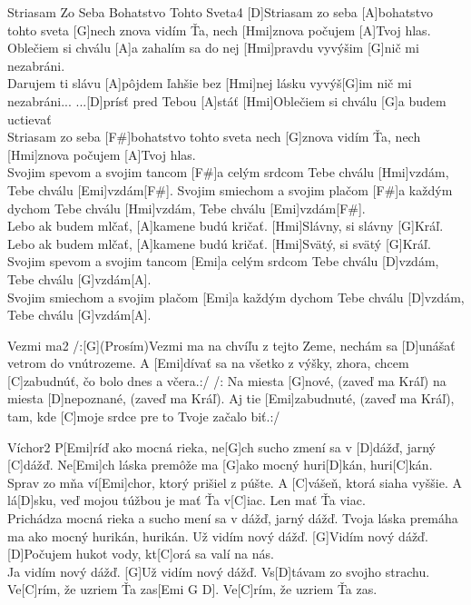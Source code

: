 \documentclass[12pt]{article}
\begin{document}
\begin{song}{Striasam Zo Seba Bohatstvo Tohto Sveta}{4}
	[D]Striasam zo seba
	[A]bohatstvo tohto sveta
	[G]nech znova vidím Ťa,
	nech [Hmi]znova počujem 
	[A]Tvoj hlas.
	\\
	[D]Oblečiem si chválu
	[A]a zahalím sa do nej
	[Hmi]pravdu vyvýšim
	[G]nič mi nezabráni.
	\\
	[D]Darujem ti slávu
	[A]pôjdem ľahšie bez 
	[Hmi]nej
	lásku vyvýš[G]im
	nič mi nezabráni...
	\columnbreak
	...[D]prísť
	pred Tebou [A]stáť
	[Hmi]Oblečiem si chválu
	[G]a budem uctievať
	\\
	[D]Striasam zo seba
	[F#]bohatstvo tohto sveta
	nech [G]znova vidím Ťa,
	nech [Hmi]znova počujem 
	[A]Tvoj hlas.
	\\
	[D]Svojim spevom 
	a svojim tancom
	[F#]a celým srdcom
	Tebe chválu [Hmi]vzdám,
	Tebe chválu [Emi]vzdám[F#].
	\columnbreak
	[D]Svojim smiechom 
	a svojim plačom
	[F#]a každým dychom
	Tebe chválu [Hmi]vzdám,
	Tebe chválu [Emi]vzdám[F#].
	\\
	[D]Lebo ak budem
	mlčať,
	[A]kamene budú kričať.
	[Hmi]Slávny, si slávny 
	[G]Kráľ.
	\\
	[D]Lebo ak budem
	mlčať,
	[A]kamene budú kričať.
	[Hmi]Svätý, si svätý [G]Kráľ.
	\columnbreak
	[D]Svojim spevom 
	a svojim tancom
	[Emi]a celým srdcom
	Tebe chválu [D]vzdám,
	Tebe chválu [G]vzdám[A].
	\\
	[D]Svojim smiechom 
	a svojim plačom
	[Emi]a každým dychom
	Tebe chválu [D]vzdám,
	Tebe chválu [G]vzdám[A].
\end{song}

\begin{song}{Vezmi ma}{2}
	/:[G](Prosím)Vezmi ma na chvíľu z tejto Zeme,
	nechám sa [D]unášať vetrom do vnútrozeme.
	A [Emi]dívať sa na všetko z výšky, zhora,
	chcem [C]zabudnúť, čo bolo dnes a včera.:/
	\columnbreak
	/: Na miesta [G]nové, (zaveď ma Kráľ)
	na miesta [D]nepoznané, (zaveď ma Kráľ).
	Aj tie [Emi]zabudnuté, (zaveď ma Kráľ),
	tam, kde [C]moje srdce pre to Tvoje začalo biť.:/
\end{song}

\begin{song}{Víchor}{2}
	P[Emi]ríď ako mocná rieka,
	ne[G]ch sucho zmení sa v [D]dážď, jarný [C]dážď.
	Ne[Emi]ch láska premôže ma
	[G]ako mocný huri[D]kán, huri[C]kán.
	\\
	Sprav zo mňa ví[Emi]chor,
	ktorý prišiel z púšte.
	A [C]vášeň, ktorá siaha vyššie.
	A lá[D]sku, veď mojou túžbou je mať Ťa v[C]iac.
	Len mať Ťa viac.
	\\
	Prichádza mocná rieka
	a sucho mení sa v dážď, jarný dážď.
	Tvoja láska premáha ma
	ako mocný hurikán, hurikán.
	\columnbreak
	[Emi]Už vidím nový dážď.
	[G]Vidím nový dážď.
	[D]Počujem hukot vody,
	kt[C]orá sa valí na nás.
	\\
	[Emi]Ja vidím nový dážď.
	[G]Už vidím nový dážď.
	Vs[D]távam zo svojho strachu.
	Ve[C]rím, že uzriem Ťa zas[Emi G D]. 
	Ve[C]rím, že uzriem Ťa zas.
\end{song}
\end{document}
